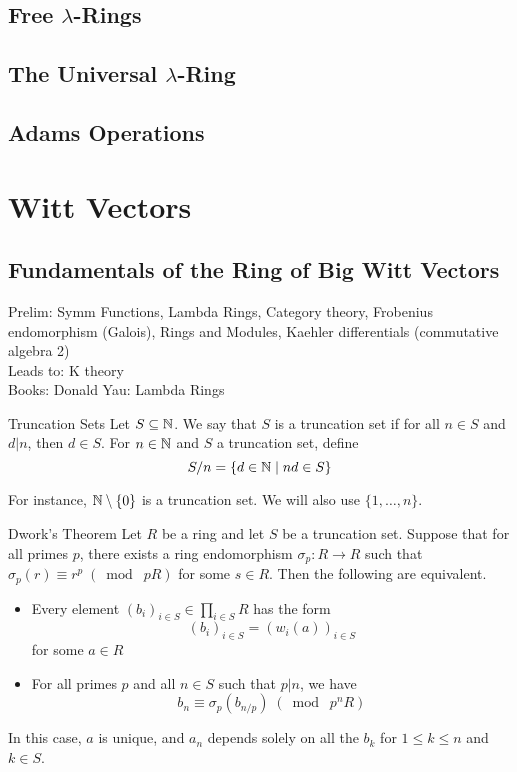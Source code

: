 \documentclass[a4paper]{article}
\begin{document}
\subsection{Free $\lambda$-Rings}

\subsection{The Universal $\lambda$-Ring}

\subsection{Adams Operations}

\pagebreak
\section{Witt Vectors}
\subsection{Fundamentals of the Ring of Big Witt Vectors}
Prelim: Symm Functions, Lambda Rings, Category theory, Frobenius endomorphism (Galois), Rings and Modules, Kaehler differentials (commutative algebra 2)\\
Leads to: K theory\\
Books: Donald Yau: Lambda Rings

\begin{defn}{Truncation Sets}{} Let $S\subseteq\mathbb{N}$. We say that $S$ is a truncation set if for all $n\in S$ and $d|n$, then $d\in S$. For $n\in\mathbb{N}$ and $S$ a truncation set, define $$S/n=\{d\in\mathbb{N}\;|\;nd\in S\}$$
\end{defn}

For instance, $\mathbb{N}\setminus\{0\}$ is a truncation set. We will also use $\{1,\dots,n\}$. 

\begin{thm}{Dwork's Theorem}{} Let $R$ be a ring and let $S$ be a truncation set. Suppose that for all primes $p$, there exists a ring endomorphism $\sigma_p:R\to R$ such that $\sigma_p(r)\equiv r^p\;(\bmod\;pR)$ for some $s\in R$. Then the following are equivalent. 
\begin{itemize}
\item Every element $(b_i)_{i\in S}\in\prod_{i\in S} R$ has the form $$(b_i)_{i\in S}=(w_i(a))_{i\in S}$$ for some $a\in R$
\item For all primes $p$ and all $n\in S$ such that $p|n$, we have $$b_n\equiv\sigma_p(b_{n/p})\;(\bmod\;p^nR)$$ 
\end{itemize}
In this case, $a$ is unique, and $a_n$ depends solely on all the $b_k$ for $1\leq k\leq n$ and $k\in S$. 
\end{thm}
\end{document}
